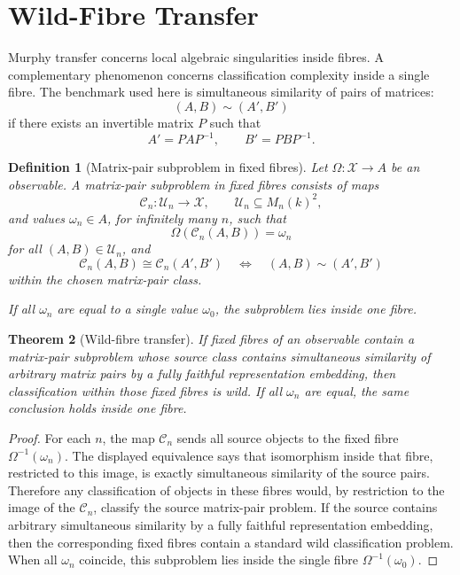 \documentclass[11pt]{article}
\newtheorem{theorem}{Theorem}[section]
\newtheorem{definition}[theorem]{Definition}
\begin{document}
\section{Wild-Fibre Transfer}

Murphy transfer concerns local algebraic singularities inside fibres. A complementary phenomenon concerns classification complexity inside a single fibre. The benchmark used here is simultaneous similarity of pairs of matrices:
\[
(A,B)\sim(A',B')
\]
if there exists an invertible matrix \(P\) such that
\[
A'=PAP^{-1},
\qquad
B'=PBP^{-1}.
\]

\begin{definition}[Matrix-pair subproblem in fixed fibres]
Let \(\Omega:\mathcal X\to A\) be an observable. A matrix-pair subproblem in fixed fibres consists of maps
\[
\mathcal C_n:\mathcal U_n\to\mathcal X,
\qquad
\mathcal U_n\subseteq M_n(k)^2,
\]
and values \(\omega_n\in A\), for infinitely many \(n\), such that
\[
\Omega(\mathcal C_n(A,B))=\omega_n
\]
for all \((A,B)\in\mathcal U_n\), and
\[
\mathcal C_n(A,B)\cong \mathcal C_n(A',B')
\quad\Longleftrightarrow\quad
(A,B)\sim(A',B')
\]
within the chosen matrix-pair class.

If all \(\omega_n\) are equal to a single value \(\omega_0\), the subproblem lies inside one fibre.
\end{definition}

\begin{theorem}[Wild-fibre transfer]
If fixed fibres of an observable contain a matrix-pair subproblem whose source class contains simultaneous similarity of arbitrary matrix pairs by a fully faithful representation embedding, then classification within those fixed fibres is wild. If all \(\omega_n\) are equal, the same conclusion holds inside one fibre.
\end{theorem}

\begin{proof}
For each \(n\), the map \(\mathcal C_n\) sends all source objects to the fixed fibre \(\Omega^{-1}(\omega_n)\). The displayed equivalence says that isomorphism inside that fibre, restricted to this image, is exactly simultaneous similarity of the source pairs. Therefore any classification of objects in these fibres would, by restriction to the image of the \(\mathcal C_n\), classify the source matrix-pair problem. If the source contains arbitrary simultaneous similarity by a fully faithful representation embedding, then the corresponding fixed fibres contain a standard wild classification problem. When all \(\omega_n\) coincide, this subproblem lies inside the single fibre \(\Omega^{-1}(\omega_0)\).
\end{proof}
\end{document}
